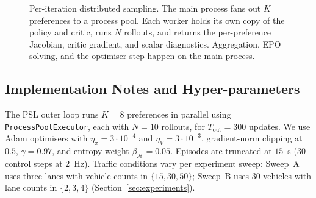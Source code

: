 \documentclass[12pt, letterpaper]{article}
\begin{document}
\begin{figure}[!ht]
\centering
{}
\caption{Per-iteration distributed sampling. The main process fans out $K$ preferences to a process pool. Each worker holds its own copy of the policy and critic, runs $N$ rollouts, and returns the per-preference Jacobian, critic gradient, and scalar diagnostics. Aggregation, EPO solving, and the optimiser step happen on the main process.}
\label{fig:parallel}
\end{figure}

\subsection{Implementation Notes and Hyper-parameters}
The PSL outer loop runs $K = 8$ preferences in parallel using \texttt{ProcessPoolExecutor}, each with $N = 10$ rollouts, for $T_{\text{out}} = 300$ updates. We use Adam optimisers with $\eta_{\pi}=3{\cdot}10^{-4}$ and $\eta_{V}=3{\cdot}10^{-3}$, gradient-norm clipping at $0.5$, $\gamma = 0.97$, and entropy weight $\beta_{\mathcal{H}}=0.05$. Episodes are truncated at $15$~s ($30$ control steps at $2$~Hz). Traffic conditions vary per experiment sweep: Sweep~A uses three lanes with vehicle counts in $\{15, 30, 50\}$; Sweep~B uses 30 vehicles with lane counts in $\{2, 3, 4\}$ (Section~\ref{sec:experiments}).
\end{document}
